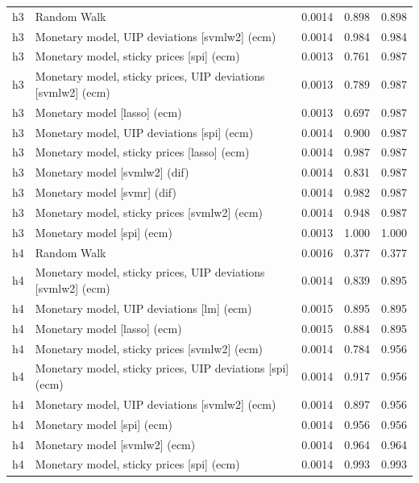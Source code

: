 \begin{ThreePartTable}
\begin{longtable}[t]{cp{5.5cm}ccc}
\addlinespace
h3 & \raggedright Random Walk & 0.0014 & 0.898 & 0.898\\
h3 & \raggedright Monetary model, UIP deviations [svmlw2] (ecm) & 0.0014 & 0.984 & 0.984\\
h3 & \raggedright Monetary model, sticky prices [spi] (ecm) & 0.0013 & 0.761 & 0.987\\
h3 & \raggedright Monetary model, sticky prices, UIP deviations [svmlw2] (ecm) & 0.0013 & 0.789 & 0.987\\
h3 & \raggedright Monetary model [lasso] (ecm) & 0.0013 & 0.697 & 0.987\\
h3 & \raggedright Monetary model, UIP deviations [spi] (ecm) & 0.0014 & 0.900 & 0.987\\
h3 & \raggedright Monetary model, sticky prices [lasso] (ecm) & 0.0014 & 0.987 & 0.987\\
h3 & \raggedright Monetary model [svmlw2] (dif) & 0.0014 & 0.831 & 0.987\\
h3 & \raggedright Monetary model [svmr] (dif) & 0.0014 & 0.982 & 0.987\\
h3 & \raggedright Monetary model, sticky prices [svmlw2] (ecm) & 0.0014 & 0.948 & 0.987\\
h3 & \raggedright Monetary model [spi] (ecm) & 0.0013 & 1.000 & 1.000\\
\addlinespace
h4 & \raggedright Random Walk & 0.0016 & 0.377 & 0.377\\
h4 & \raggedright Monetary model, sticky prices, UIP deviations [svmlw2] (ecm) & 0.0014 & 0.839 & 0.895\\
h4 & \raggedright Monetary model, UIP deviations [lm] (ecm) & 0.0015 & 0.895 & 0.895\\
h4 & \raggedright Monetary model [lasso] (ecm) & 0.0015 & 0.884 & 0.895\\
h4 & \raggedright Monetary model, sticky prices [svmlw2] (ecm) & 0.0014 & 0.784 & 0.956\\
h4 & \raggedright Monetary model, sticky prices, UIP deviations [spi] (ecm) & 0.0014 & 0.917 & 0.956\\
h4 & \raggedright Monetary model, UIP deviations [svmlw2] (ecm) & 0.0014 & 0.897 & 0.956\\
h4 & \raggedright Monetary model [spi] (ecm) & 0.0014 & 0.956 & 0.956\\
h4 & \raggedright Monetary model [svmlw2] (ecm) & 0.0014 & 0.964 & 0.964\\
h4 & \raggedright Monetary model, sticky prices [spi] (ecm) & 0.0014 & 0.993 & 0.993\\

\end{longtable}
\end{ThreePartTable}
